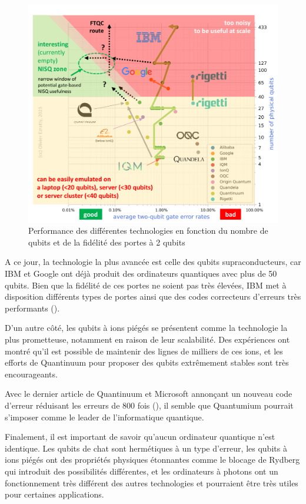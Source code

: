 \documentclass{article}
\begin{document}
\begin{multicols}{2}
\begin{figure}[H]
    \centering
    \includegraphics[width = \columnwidth]{fig/NISQ.png}
    \caption{Performance des différentes technologies en fonction du nombre de qubits et de la fidélité des portes à 2 qubits}
    \label{fig:nisq}
\end{figure}



A ce jour, la technologie la plus avancée est celle des qubits supraconducteurs, car IBM et Google ont déjà produit des ordinateurs quantiques avec plus de 50 qubits. Bien que la fidélité de ces portes ne soient pas très élevées, IBM met à disposition différents types de portes ainsi que des codes correcteurs d'erreurs très performants (\cite{bravyi_high-threshold_2024}).

D'un autre côté, les qubits à ions piégés se présentent comme la technologie la plus prometteuse, notamment en raison de leur scalabilité. Des expériences ont montré qu'il est possible de maintenir des lignes de milliers de ces ions, et les efforts de Quantinuum pour proposer des qubits extrêmement stables sont très encourageants.

Avec le dernier article de Quantinuum et Microsoft annonçant un nouveau code d'erreur réduisant les erreurs de 800 fois (\cite{zander_advancing_2024}), il semble que Quantumium pourrait s'imposer comme le leader de l'informatique quantique.

Finalement, il est important de savoir qu'aucun ordinateur quantique n'est identique. Les qubits de chat sont hermétiques à un type d'erreur, les qubits à ions piégés ont des propriétés physiques étonnantes comme le blocage de Rydberg qui introduit des possibilités différentes, et les ordinateurs à photons ont un fonctionnement très différent des autres technologies et pourraient être très utiles pour certaines applications.


\end{multicols}
\end{document}
